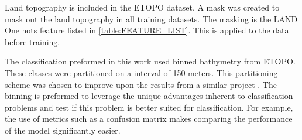 \par
Land topography is included in the \ac{ETOPO} dataset.
A mask was created to mask out the land topography in all training datasets.
The masking is the LAND One hots feature listed in \ref{table:FEATURE_LIST}.
This is applied to the data before training.

\par
The classification preformed in this work used binned bathymetry from \ac{ETOPO}.
These classes were partitioned on a interval of 150 meters.
This partitioning scheme was chosen to improve upon the results from a similar project \cite{jena2012prediction}.
The binning is preformed to leverage the unique advantages inherent to classification problems and test if this problem is better suited for classification.
For example, the use of metrics such as a confusion matrix makes comparing the performance of the model significantly easier.
